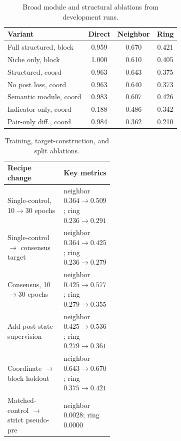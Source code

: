 \documentclass[sigconf,review,balance=false]{acmart}
\begin{document}
\begin{table}[t]
\centering
\caption{Broad module and structural ablations from development runs.}
\label{tab:app_ablation_modules}
\scriptsize
\setlength{\tabcolsep}{3pt}
\renewcommand{\arraystretch}{1.14}
\begin{tabular}{@{}lccc@{}}
\toprule
Variant & Direct & Neighbor & Ring \\
\midrule
Full structured, block & 0.959 & 0.670 & 0.421 \\
Niche only, block & 1.000 & 0.610 & 0.405 \\
Structured, coord & 0.963 & 0.643 & 0.375 \\
No post loss, coord & 0.963 & 0.640 & 0.373 \\
Semantic module, coord & 0.983 & 0.607 & 0.426 \\
Indicator only, coord & 0.188 & 0.486 & 0.342 \\
Pair-only diff., coord & 0.984 & 0.362 & 0.210 \\
\bottomrule
\end{tabular}
\end{table}

\begin{table}[t]
\centering
\caption{Training, target-construction, and split ablations.}
\label{tab:app_ablation_recipe}
\footnotesize
\setlength{\tabcolsep}{4pt}
\renewcommand{\arraystretch}{1.14}
\begin{tabularx}{\linewidth}{@{}>{\raggedright\arraybackslash}X>{\raggedright\arraybackslash}p{0.42\linewidth}@{}}
\toprule
Recipe change & Key metrics \\
\midrule
Single-control, 10$\rightarrow$30 epochs & neighbor $0.364\rightarrow0.509$; ring $0.236\rightarrow0.291$ \\
Single-control $\rightarrow$ consensus target & neighbor $0.364\rightarrow0.425$; ring $0.236\rightarrow0.279$ \\
Consensus, 10$\rightarrow$30 epochs & neighbor $0.425\rightarrow0.577$; ring $0.279\rightarrow0.355$ \\
Add post-state supervision & neighbor $0.425\rightarrow0.536$; ring $0.279\rightarrow0.361$ \\
Coordinate $\rightarrow$ block holdout & neighbor $0.643\rightarrow0.670$; ring $0.375\rightarrow0.421$ \\
Matched-control $\rightarrow$ strict pseudo-pre & neighbor $0.0028$; ring $0.0000$ \\
\bottomrule
\end{tabularx}
\end{table}
\end{document}
